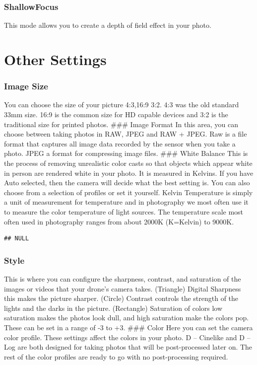 \documentclass[
]{book}
\begin{document}
\hypertarget{shallowfocus}{%
\subsection{ShallowFocus}\label{shallowfocus}}

This mode allows you to create a depth of field effect in your photo.

\hypertarget{other-settings}{%
\chapter{Other Settings}\label{other-settings}}

\hypertarget{image-size}{%
\subsection{Image Size}\label{image-size}}

You can choose the size of your picture 4:3,16:9 3:2. 4:3 was the old standard 33mm size. 16:9 is the common size for HD capable devices and 3:2 is the traditional size for printed photos.
\#\#\# Image Format
In this area, you can choose between taking photos in RAW, JPEG and RAW + JPEG. Raw is a file format that captures all image data recorded by the sensor when you take a photo. JPEG a format for compressing image files.
\#\#\# White Balance
This is the process of removing unrealistic color casts so that objects which appear white in person are rendered white in your photo. It is measured in Kelvins. If you have Auto selected, then the camera will decide what the best setting is. You can also choose from a selection of profiles or set it yourself. Kelvin Temperature is simply a unit of measurement for temperature and in photography we most often use it to measure the color temperature of light sources. The temperature scale most often used in photography ranges from about 2000K (K=Kelvin) to 9000K.

\begin{verbatim}
## NULL
\end{verbatim}

\hypertarget{style}{%
\subsection{Style}\label{style}}

This is where you can configure the sharpness, contrast, and saturation of the images or videos that your drone's camera takes. (Triangle) Digital Sharpness this makes the picture sharper. (Circle) Contrast controls the strength of the lights and the darks in the picture. (Rectangle) Saturation of colors low saturation makes the photos look dull, and high saturation make the colors pop. These can be set in a range of -3 to +3.
\#\#\# Color
Here you can set the camera color profile. These settings affect the colors in your photo. D -- Cinelike and D --Log are both designed for taking photos that will be post-processed later on. The rest of the color profiles are ready to go with no post-processing required.
\end{document}
